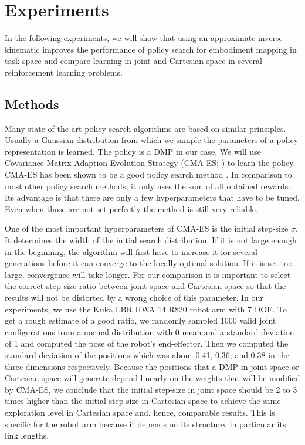 \documentclass{article}
\begin{document}
\section{Experiments}

In the following experiments, we will show that using an approximate inverse
kinematic improves the performance of policy search \cite{Deisenroth2013}
for embodiment mapping in task space and compare learning in joint and
Cartesian space in several reinforcement learning problems.

\subsection{Methods}

Many state-of-the-art policy search
algorithms \cite{Peters2007,Peters2010,Kober2010,Theodorou2010,Neumann2011}
are based on similar principles. Usually a Gaussian distribution from which
we sample the parameters of a policy representation is learned.
The policy is a DMP in our case. We will use Covariance Matrix Adaption
Evolution Strategy (CMA-ES; \cite{Hansen2001}) to learn the policy.
CMA-ES has been shown to be a good policy search method
\cite{HeidrichMeisner2008}. In comparison to most other policy search methods,
it only uses the sum of all obtained rewards. Its advantage is that there are
only a few hyperparameters that have to be tuned. Even when those are not set
perfectly the method is still very reliable.

One of the most important hyperparameters of CMA-ES is the initial step-size
$\sigma$.
It determines the width of the initial search distribution. If it is not large
enough in the beginning, the algorithm will first have to increase it for
several generations before it can converge to the locally optimal solution.
If it is set too large, convergence will take longer. For our comparison it
is important to select the correct step-size ratio between joint space and
Cartesian space so that the results will not be distorted by a wrong choice of
this parameter.
In our experiments, we use the Kuka LBR IIWA 14 R820 robot arm with 7 DOF.
To get a rough estimate of a good ratio, we randomly sampled
1000 valid joint configurations from a normal distribution with 0 mean and a
standard deviation of 1 and computed the pose of the robot's end-effector.
Then we computed the standard deviation of the positions which was about
0.41, 0.36, and 0.38 in the three dimensions respectively.
Because the positions that a DMP in joint space or Cartesian space will
generate depend linearly on the weights that will be modified by CMA-ES,
we conclude that the initial step-size in joint space should be 2 to 3
times higher than the initial step-size in Cartesian space to achieve
the same exploration level in Cartesian space and, hence, comparable
results. This is specific for the robot arm because it depends on its
structure, in particular its link lengths.
\end{document}
